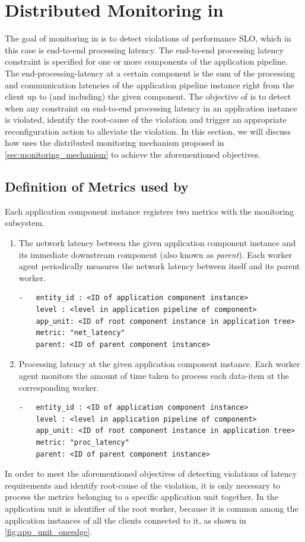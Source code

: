 \section{Distributed Monitoring in \oneedge{}}
The goal of monitoring in \oneedge{} is to detect violations of performance SLO, which in this case is end-to-end processing latency. The end-to-end processing latency constraint is specified for one or more components of the application pipeline. The end-processing-latency at a certain component is the sum of the processing and communication latencies of the application pipeline instance right from the client up to (and including) the given component. The objective of \oneedge{} is to detect when any constraint on end-to-end processing latency in an application instance is violated, identify the root-cause of the violation and trigger an appropriate reconfiguration action to alleviate the violation. In this section, we will discuss how \oneedge{} uses the distributed monitoring mechanism proposed in \cref{sec:monitoring_mechanism} to achieve the aforementioned objectives.

\subsection{Definition of Metrics used by \oneedge{}}
Each application component instance registers two metrics with the monitoring subsystem. 
\begin{enumerate}
\item The network latency between the given application component instance and its immediate downstream component (also known as \textit{parent}). Each worker agent periodically measures the network latency between itself and its parent worker.

\begin{verbatim}
-   entity_id : <ID of application component instance>
    level : <level in application pipeline of component>
    app_unit: <ID of root component instance in application tree>
    metric: "net_latency"
    parent: <ID of parent component instance>
\end{verbatim}
\item Processing latency at the given application component instance. Each worker agent monitors the amount of time taken to process each data-item at the corresponding worker.
\begin{verbatim}
-   entity_id : <ID of application component instance>
    level : <level in application pipeline of component>
    app_unit: <ID of root component instance in application tree>
    metric: "proc_latency"
    parent: <ID of parent component instance>
\end{verbatim}
\end{enumerate}
In order to meet the aforementioned objectives of detecting violations of latency requirements and identify root-cause of the violation, it is only necessary to process the metrics belonging to a specific application unit together. In \oneedge{} the application unit is identifier of the root worker, because it is common among the application instances of all the clients connected to it, as shown in \cref{fig:app_unit_oneedge}. 

